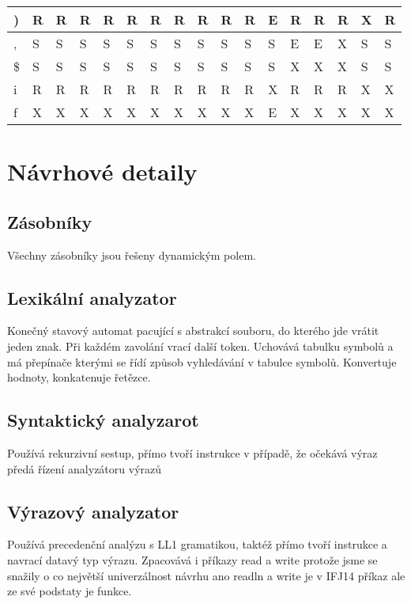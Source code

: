 \documentclass[a4paper]{article}
\begin{document}
\begin{table}[h]
\begin{tabular}{|l|l|l|l|l|l|l|l|l|l|l|l|l|l|l|l|l|}
)                     & R & R & R & R & R         & R            & R          & R             & R & R                     & E & R & R & R & X & R \\ \hline
,                     & S & S & S & S & S         & S            & S          & S             & S & S                     & S & E & E & X & S & S \\ \hline
\$                     & S & S & S & S & S         & S            & S          & S             & S & S                     & S & X & X & X & S & S \\ \hline
i                     & R & R & R & R & R         & R            & R          & R             & R & R                     & X & R & R & R & X & X \\ \hline
f                     & X & X & X & X & X         & X            & X          & X             & X & X                     & E & X & X & X & X & X \\ \hline
\end{tabular}
\end{table}

\section{Návrhové detaily}

\subsection{Zásobníky}
Všechny zásobníky jsou řešeny dynamickým polem.

\subsection{Lexikální analyzator}
Konečný stavový automat pacující s abstrakcí souboru, do kterého jde vrátit jeden znak.
Při každém zavolání vrací další token. Uchovává tabulku symbolů a má přepínače kterými se řídí způsob vyhledávání v tabulce symbolů. Konvertuje hodnoty, konkatenuje řetězce.

\subsection{Syntaktický analyzarot}
Používá rekurzivní sestup, přímo tvoří instrukce v případě, že očekává výraz předá řízení analyzátoru výrazů

\subsection{Výrazový analyzator}
Používá precedenční analýzu s LL1 gramatikou, taktéž přímo tvoří instrukce a navrací datavý typ výrazu. Zpacovává i příkazy read a write protože jsme se snažily o co největší univerzálnost návrhu ano readln a write je v IFJ14 příkaz ale ze své podstaty je funkce.
\end{document}

